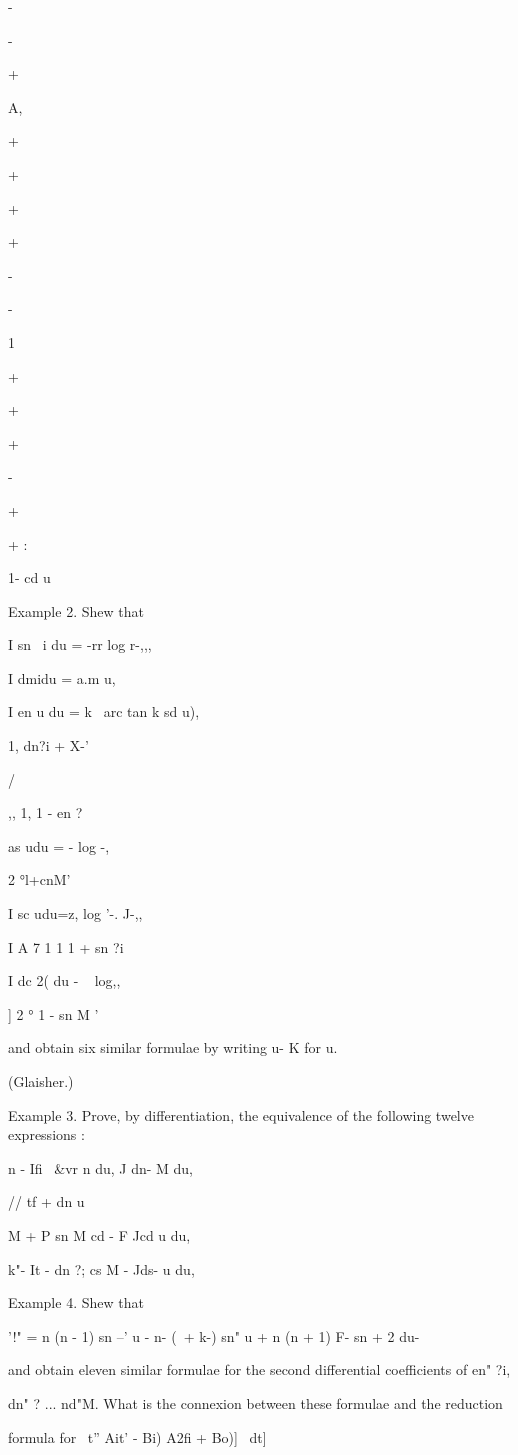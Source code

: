 -

-

+

A,

+

+

+

+

-

-

1

+

+

+

-

+

+ :

1- cd u

Example 2. Shew that

I sn \ i du = -rr log r-,,,

I dmidu = a.m u,

I en u du = k~ arc tan k sd u),

1, dn?i + X-'

/

,, 1, 1 - en ?

as udu = - log -,

2 °l+cnM'

I sc udu=z, log '-. J-,,

I A 7 1 1 1 + sn ?i

I dc 2( du - ~ log,,

] 2 ° 1 - sn M '

and obtain six similar formulae by writing u- K for u.

(Glaisher.)

Example 3. Prove, by differentiation, the equivalence of the following
twelve expressions :

n - Ifi \ \&vr n du, J dn- M du,

// tf + dn u%

M + P sn M cd - F Jcd u du,

k"- It - dn ?; cs M - Jds- u du,

Example 4. Shew that

'!" = n (n - 1) sn --' u - n- (\ + k-) sn" u + n (n + 1) F- sn + 2 du-

and obtain eleven similar formulae for the second differential
coefficients of en" ?i,

dn" ? ... nd"M. What is the connexion between these formulae and the
reduction

formula for \ t'' Ait' - Bi) A2fi + Bo)]~ dt]

